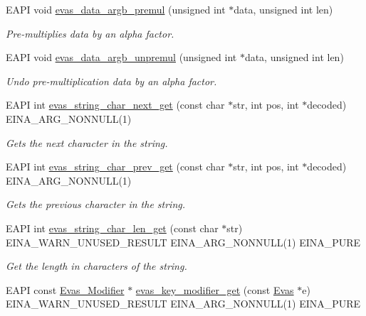 \begin{DoxyCompactItemize}
EAPI void \hyperlink{group__Evas__Utils_gad61423a02fa7c3cb0293c3bdd5516216}{evas\_\-data\_\-argb\_\-premul} (unsigned int $\ast$data, unsigned int len)
\begin{DoxyCompactList}\small\item\em Pre-\/multiplies data by an alpha factor. \item\end{DoxyCompactList}\item 
EAPI void \hyperlink{group__Evas__Utils_ga6794135ce6545bd5e16f6563043a8f18}{evas\_\-data\_\-argb\_\-unpremul} (unsigned int $\ast$data, unsigned int len)
\begin{DoxyCompactList}\small\item\em Undo pre-\/multiplication data by an alpha factor. \item\end{DoxyCompactList}\item 
EAPI int \hyperlink{group__Evas__Utils_ga31161605cf449d16e0ea0183509a1e3b}{evas\_\-string\_\-char\_\-next\_\-get} (const char $\ast$str, int pos, int $\ast$decoded) EINA\_\-ARG\_\-NONNULL(1)
\begin{DoxyCompactList}\small\item\em Gets the next character in the string. \item\end{DoxyCompactList}\item 
EAPI int \hyperlink{group__Evas__Utils_ga20119def41aa1f24aea7961b3fa0fd72}{evas\_\-string\_\-char\_\-prev\_\-get} (const char $\ast$str, int pos, int $\ast$decoded) EINA\_\-ARG\_\-NONNULL(1)
\begin{DoxyCompactList}\small\item\em Gets the previous character in the string. \item\end{DoxyCompactList}\item 
EAPI int \hyperlink{group__Evas__Utils_gaf9edd726590b1f56ca3e566ba1a2dbb2}{evas\_\-string\_\-char\_\-len\_\-get} (const char $\ast$str) EINA\_\-WARN\_\-UNUSED\_\-RESULT EINA\_\-ARG\_\-NONNULL(1) EINA\_\-PURE
\begin{DoxyCompactList}\small\item\em Get the length in characters of the string. \item\end{DoxyCompactList}\item 
EAPI const \hyperlink{Evas_8h_a198d0b10861c1da456004688d3443e96}{Evas\_\-Modifier} $\ast$ \hyperlink{Evas_8h_a5c233a1e9eea970c1db0de87ff343e77}{evas\_\-key\_\-modifier\_\-get} (const \hyperlink{group__Evas__Canvas_ga5ff87cc4ce6bc43e3b640a6d37f73043}{Evas} $\ast$e) EINA\_\-WARN\_\-UNUSED\_\-RESULT EINA\_\-ARG\_\-NONNULL(1) EINA\_\-PURE

\end{DoxyCompactItemize}
